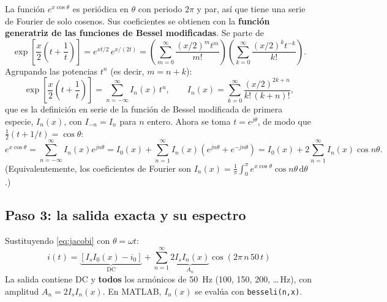 \documentclass[11pt,letterpaper]{article}
\newcommand{\dd}{\,\mathrm{d}}
\begin{document}
La función $e^{x\cos\theta}$ es periódica en $\theta$ con periodo $2\pi$ y par, así que tiene una serie de
Fourier de solo cosenos. Sus coeficientes se obtienen con la \textbf{función generatriz de las funciones de
Bessel modificadas}. Se parte de
\begin{equation}
  \exp\!\left[\frac{x}{2}\left(t+\frac1t\right)\right]=e^{xt/2}\,e^{x/(2t)}
  =\left(\sum_{m=0}^{\infty}\frac{(x/2)^m t^m}{m!}\right)\left(\sum_{k=0}^{\infty}\frac{(x/2)^k t^{-k}}{k!}\right).
\end{equation}
Agrupando las potencias $t^n$ (es decir, $m=n+k$):
\begin{equation}
  \exp\!\left[\frac{x}{2}\left(t+\frac1t\right)\right]=\sum_{n=-\infty}^{\infty}I_n(x)\,t^n,
  \qquad I_n(x)=\sum_{k=0}^{\infty}\frac{(x/2)^{2k+n}}{k!\,(k+n)!},
  \label{eq:Inserie}
\end{equation}
que es la definición en serie de la función de Bessel modificada de primera especie, $I_n(x)$, con
$I_{-n}=I_n$ para $n$ entero. Ahora se toma $t=e^{j\theta}$, de modo que $\tfrac12(t+1/t)=\cos\theta$:
\begin{equation}
  e^{x\cos\theta}=\sum_{n=-\infty}^{\infty}I_n(x)e^{jn\theta}
  =I_0(x)+\sum_{n=1}^{\infty}I_n(x)\left(e^{jn\theta}+e^{-jn\theta}\right)
  =I_0(x)+2\sum_{n=1}^{\infty}I_n(x)\cos n\theta .
  \label{eq:jacobi}
\end{equation}
(Equivalentemente, los coeficientes de Fourier son $I_n(x)=\frac1\pi\int_0^\pi e^{x\cos\theta}\cos n\theta\dd\theta$.)

\subsection{Paso 3: la salida exacta y su espectro}

Sustituyendo \eqref{eq:jacobi} con $\theta=\omega t$:
\begin{equation}
  \boxed{\,i(t)=\underbrace{\left[I_sI_0(x)-i_0\right]}_{\text{DC}}+\sum_{n=1}^{\infty}\underbrace{2I_sI_n(x)}_{A_n}\cos(2\pi\,n\,50\,t)\,}
  \label{eq:2b}
\end{equation}
La salida contiene DC y \textbf{todos} los armónicos de \SI{50}{Hz} (100, 150, 200, \ldots\,Hz), con amplitud
$A_n=2I_sI_n(x)$. En MATLAB, $I_n(x)$ se evalúa con \texttt{besseli(n,x)}.
\end{document}

